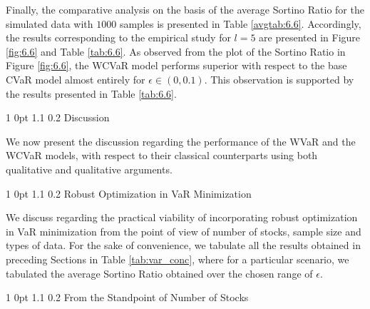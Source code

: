 \documentclass[12pt]{article}
\makeatletter
\numberwithin{equation}{section}
\renewcommand{\section}{
  \@startsection
  {section}%
  {1}%
  {0pt}%
  {1.1\baselineskip}%
  {0.2\baselineskip}%
  {\sc \centering}%
}
\renewcommand{\subsection}{
  \@startsection
  {subsection}%
  {1}%
  {0pt}%
  {1.1\baselineskip}%
  {0.2\baselineskip}%
  {\sc \centering}%
}
\renewcommand{\subsubsection}{
  \@startsection
  {subsubsection}%
  {1}%
  {0pt}%
  {1.1\baselineskip}%
  {0.2\baselineskip}%
  {\sc \centering}%
}
\makeatother
\begin{document}
Finally, the comparative analysis on the basis of the average Sortino Ratio for the simulated data with $1000$ samples is presented in Table \ref{avgtab:6.6}. Accordingly, the results corresponding to the empirical study for $l=5$ are presented in Figure \ref{fig:6.6} and Table \ref{tab:6.6}. As observed from the plot of the Sortino Ratio in Figure \ref{fig:6.6},
the WCVaR model performs superior with respect to the base CVaR model almost entirely for $\epsilon \in (0,0.1)$. This observation is supported by the results presented in Table \ref{tab:6.6}.

\section{Discussion}
\label{Discussion}

We now present the discussion regarding the performance of the WVaR and the WCVaR models, with respect to their classical counterparts using both qualitative and qualitative arguments.

\subsection{Robust Optimization in VaR Minimization}

We discuss regarding the practical viability of incorporating robust optimization in VaR minimization from the point of view of number of stocks, sample size and types of data. For the sake of convenience, we tabulate all the results obtained in preceding Sections in Table \ref{tab:var_conc}, where for a particular scenario, we tabulated the average Sortino Ratio obtained over the chosen range of $\epsilon$.

\subsubsection{From the Standpoint of Number of Stocks}
\end{document}
